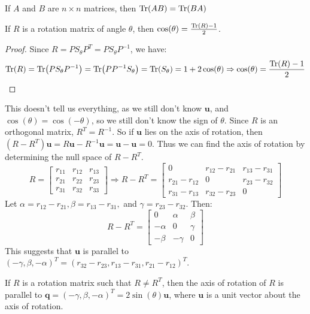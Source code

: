 \documentclass[../main.tex]{subfiles}
\begin{document}
%
\begin{theorem}
If $A$ and $B$ are $n\times n$ matrices, then $\Tr(AB) = \Tr(BA)$
\end{theorem}
\begin{theorem}
If $R$ is a rotation matrix of angle $\theta$, then $\cos(\theta) = \frac{\Tr(R) - 1}{2}$.
\end{theorem}
\begin{proof}
Since $R = PS_{\theta} P^T = PS_{\theta}P^{-1}$, we have:
\begin{equation*}
    \Tr(R) = \Tr(PS_{\theta}P^{-1}) = \Tr(PP^{-1}S_{\theta}) = \Tr(S_{\theta}) = 1+2\cos(\theta)\Rightarrow \cos(\theta) = \frac{\Tr(R)-1}{2}
\end{equation*}
\end{proof}
%
This doesn't tell us everything, as we still don't know $\mathbf{u}$, and $\cos(\theta) = \cos(-\theta)$, so we still don't know the sign of $\theta$. Since $R$ is an orthogonal matrix, $R^T = R^{-1}$. So if $\mathbf{u}$ lies on the axis of rotation, then $(R-R^T)\mathbf{u} = R\mathbf{u}-R^{-1}\mathbf{u} = \mathbf{u}-\mathbf{u} = 0$. Thus we can find the axis of rotation by determining the null space of $R-R^T$. 
\begin{equation*}
    R = \begin{bmatrix} r_{11} & r_{12} & r_{13} \\ r_{21} & r_{22} & r_{23} \\ r_{31} & r_{32} & r_{33} \end{bmatrix} \Rightarrow R-R^{T} = \begin{bmatrix} 0 & r_{12} - r_{21} & r_{13} - r_{31} \\ r_{21} - r_{12} & 0 & r_{23}-r_{32} \\ r_{31} - r_{13} & r_{32} - r_{23} & 0 \end{bmatrix}
\end{equation*}
Let $\alpha = r_{12} - r_{21},\beta = r_{13} - r_{31},$ and $\gamma = r_{23}-r_{32}$. Then:
\begin{equation*}
    R-R^T = \begin{bmatrix} 0 & \alpha & \beta \\ -\alpha & 0 & \gamma \\ -\beta & -\gamma & 0 \end{bmatrix}
\end{equation*}
This suggests that $\mathbf{u}$ is parallel to $(-\gamma, \beta, -\alpha)^{T} = (r_{32}-r_{23}, r_{13}-r_{31}, r_{21}-r_{12})^{T}$.
%
\begin{theorem}
If $R$ is a rotation matrix such that $R\ne R^T$, then the axis of rotation of $R$ is parallel to $\mathbf{q}=(-\gamma, \beta, -\alpha)^{T} = 2\sin(\theta)\mathbf{u}$, where $\mathbf{u}$ is a unit vector about the axis of rotation.
\end{theorem}
\end{document}
